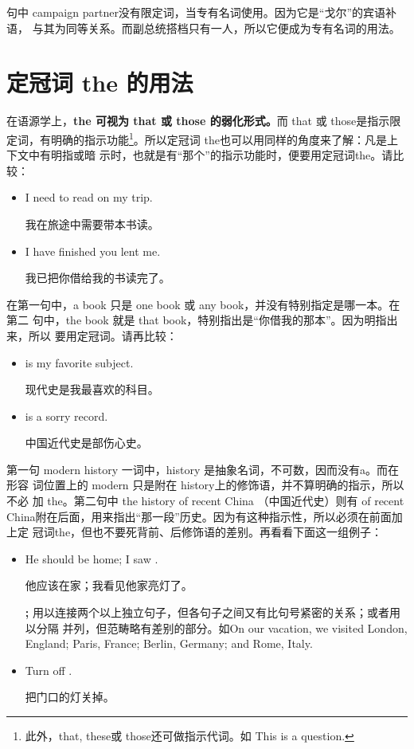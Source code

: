 句中 campaign partner没有限定词，当专有名词使用。因为它是“戈尔”的宾语补语，
与其为同等关系。而副总统搭档只有一人，所以它便成为专有名词的用法。

\section{定冠词 the 的用法}

在语源学上，\textbf{the 可视为 that 或 those 的弱化形式。}而 that 或 those是指示限
定词，有明确的指示功能\footnote{此外，that, these或 those还可做指示代词。如 This is a
  question. }。所以定冠词 the也可以用同样的角度来了解：凡是上下文中有明指或暗
示时，也就是有“那个”的指示功能时，便要用定冠词the。请比较：

\begin{itemize}
\item  I need  to read on my trip.

  我在旅途中需要带本书读。
\item  I have finished  you lent me.

  我已把你借给我的书读完了。
\end{itemize}

在第一句中，a book 只是 one book 或 any book，并没有特别指定是哪一本。在第二
句中，the book 就是 that book，特别指出是“你借我的那本”。因为明指出来，所以
要用定冠词。请再比较：

\begin{itemize}
\item  {} is my favorite subject.

  现代史是我最喜欢的科目。
\item  {} is a sorry record.

  中国近代史是部伤心史。
\end{itemize}

第一句 modern history 一词中，history 是抽象名词，不可数，因而没有a。而在形容
词位置上的 modern 只是附在 history上的修饰语，并不算明确的指示，所以不必
加 the。第二句中 the history of recent China （中国近代史）则有 of recent
China附在后面，用来指出“那一段”历史。因为有这种指示性，所以必须在前面加上定
冠词the，但也不要死背前、后修饰语的差别。再看看下面这一组例子：

\begin{itemize}
\item  He should be home; I saw .

他应该在家；我看见他家亮灯了。

\textbf{;} 用以连接两个以上独立句子，但各句子之间又有比句号紧密的关系；或者用以分隔
并列，但范畴略有差别的部分。如On our vacation, we visited London, England;
Paris, France; Berlin, Germany; and Rome, Italy.

\item  Turn off .

把门口的灯关掉。
\end{itemize}

